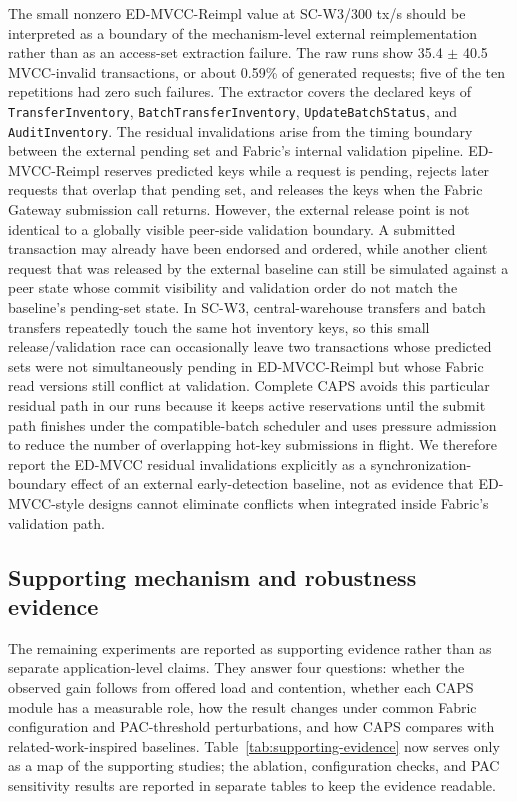 \documentclass[fleqn,10pt,lineno]{wlpeerj}
\begin{document}
The small nonzero ED-MVCC-Reimpl value at SC-W3/300 tx/s should be interpreted as a boundary of the mechanism-level external reimplementation rather than as an access-set extraction failure. The raw runs show 35.4 $\pm$ 40.5 MVCC-invalid transactions, or about 0.59\% of generated requests; five of the ten repetitions had zero such failures. The extractor covers the declared keys of \texttt{TransferInventory}, \texttt{BatchTransferInventory}, \texttt{UpdateBatchStatus}, and \texttt{AuditInventory}. The residual invalidations arise from the timing boundary between the external pending set and Fabric's internal validation pipeline. ED-MVCC-Reimpl reserves predicted keys while a request is pending, rejects later requests that overlap that pending set, and releases the keys when the Fabric Gateway submission call returns. However, the external release point is not identical to a globally visible peer-side validation boundary. A submitted transaction may already have been endorsed and ordered, while another client request that was released by the external baseline can still be simulated against a peer state whose commit visibility and validation order do not match the baseline's pending-set state. In SC-W3, central-warehouse transfers and batch transfers repeatedly touch the same hot inventory keys, so this small release/validation race can occasionally leave two transactions whose predicted sets were not simultaneously pending in ED-MVCC-Reimpl but whose Fabric read versions still conflict at validation. Complete CAPS avoids this particular residual path in our runs because it keeps active reservations until the submit path finishes under the compatible-batch scheduler and uses pressure admission to reduce the number of overlapping hot-key submissions in flight. We therefore report the ED-MVCC residual invalidations explicitly as a synchronization-boundary effect of an external early-detection baseline, not as evidence that ED-MVCC-style designs cannot eliminate conflicts when integrated inside Fabric's validation path.

\FloatBarrier

\subsection*{Supporting mechanism and robustness evidence}

The remaining experiments are reported as supporting evidence rather than as separate application-level claims. They answer four questions: whether the observed gain follows from offered load and contention, whether each CAPS module has a measurable role, how the result changes under common Fabric configuration and PAC-threshold perturbations, and how CAPS compares with related-work-inspired baselines. Table~\ref{tab:supporting-evidence} now serves only as a map of the supporting studies; the ablation, configuration checks, and PAC sensitivity results are reported in separate tables to keep the evidence readable.
\end{document}
